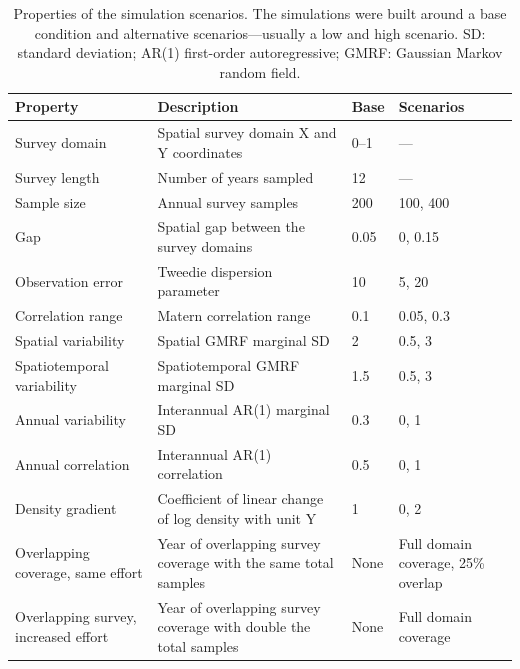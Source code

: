 \documentclass[11pt]{article}
\begin{document}
\begin{table}[htpb]
\centering
\caption{Properties of the simulation scenarios. The simulations were built around a base condition and alternative scenarios---usually a low and high scenario. SD: standard deviation; AR(1) first-order autoregressive; GMRF: Gaussian Markov random field.}
\label{tab:sim-scenarios}
\begin{tabular}{p{1.8in} p{2.2 in}l p{1.5in}@{}}
\toprule
Property & Description & Base & Scenarios \\
\midrule
Survey domain & Spatial survey domain X and Y coordinates & 0--1 & --- \\
Survey length & Number of years sampled & 12 & --- \\
Sample size & Annual survey samples & 200 & 100, 400 \\
Gap & Spatial gap between the survey domains & 0.05 & 0, 0.15 \\
Observation error & Tweedie dispersion parameter & 10 & 5, 20 \\
Correlation range & Matern correlation range & 0.1 & 0.05, 0.3 \\
Spatial variability & Spatial GMRF marginal SD & 2 & 0.5, 3 \\ 
Spatiotemporal variability & Spatiotemporal GMRF marginal SD & 1.5 & 0.5, 3 \\
Annual variability & Interannual AR(1) marginal SD & 0.3 & 0, 1 \\
Annual correlation & Interannual AR(1) correlation & 0.5 & 0, 1 \\
Density gradient & Coefficient of linear change of log density with unit Y & 1 & 0, 2 \\
Overlapping coverage, same effort & Year of overlapping survey coverage with the same total samples & None & Full domain coverage, 25\% overlap \\
Overlapping survey, increased effort & Year of overlapping survey coverage with double the total samples & None & Full domain coverage \\
\bottomrule
\end{tabular}
\end{table}

\clearpage
\end{document}
